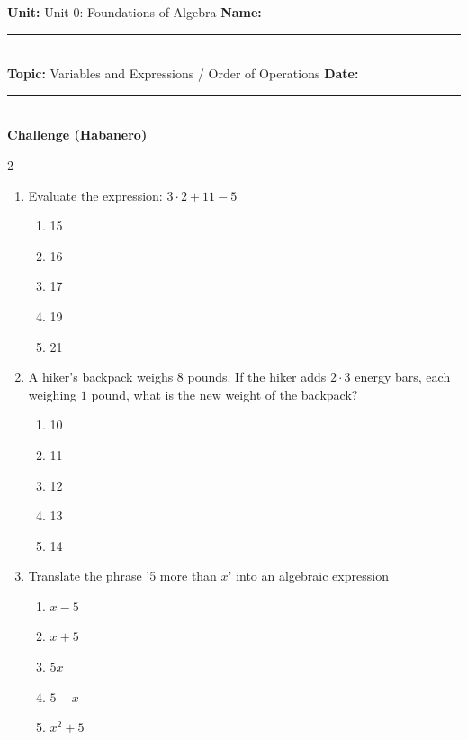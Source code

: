 \documentclass[10pt]{article}
\begin{document}
\enlargethispage{2.5cm}

\begin{tcolorbox}[colback=mainblue!5, colframe=mainblue, sharp corners, boxrule=0.5pt]
    \small \textbf{Unit:} Unit 0: Foundations of Algebra \hfill \textbf{Name:} \rule{3cm}{0.4pt} \\
    \small \textbf{Topic:} Variables and Expressions / Order of Operations \hfill \textbf{Date:} \rule{2cm}{0.4pt} \\
    \centering \textbf{\large Challenge (Habanero)}
\end{tcolorbox}

\vspace{0.2cm}

\begin{multicols}{2}
\begin{enumerate}[label=\textbf{Q\arabic*.}, leftmargin=*, itemsep=6pt, parsep=0pt]

  \item \small Evaluate the expression: $3 \cdot 2 + 11 - 5$
  \begin{enumerate}[label=(\Alph*), leftmargin=0.6cm, nosep, itemsep=2pt]
    \item 15
    \item 16
    \item 17
    \item 19
    \item 21
  \end{enumerate}

  \item \small A hiker's backpack weighs $8$ pounds. If the hiker adds $2 \cdot 3$ energy bars, each weighing $1$ pound, what is the new weight of the backpack?
  \begin{enumerate}[label=(\Alph*), leftmargin=0.6cm, nosep, itemsep=2pt]
    \item 10
    \item 11
    \item 12
    \item 13
    \item 14
  \end{enumerate}

  \item \small Translate the phrase '5 more than $x$' into an algebraic expression
  \begin{enumerate}[label=(\Alph*), leftmargin=0.6cm, nosep, itemsep=2pt]
    \item $x - 5$
    \item $x + 5$
    \item $5x$
    \item $5 - x$
    \item $x^2 + 5$
  \end{enumerate}


\end{enumerate}
\end{multicols}
\end{document}
